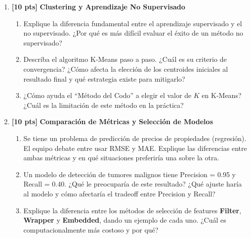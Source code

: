 \documentclass[11pt,a4paper]{article}
\newcommand{\puntaje}[1]{\textbf{[#1 pts]}}
\begin{document}
\begin{enumerate}[label=\textbf{\arabic*.}, leftmargin=*, itemsep=10pt]

\item \puntaje{10} \textbf{Clustering y Aprendizaje No Supervisado}

\begin{enumerate}[label=\textbf{\alph*)}]
  \item Explique la diferencia fundamental entre el aprendizaje supervisado y el no supervisado. ¿Por qu\'e es m\'as dif\'icil evaluar el \'exito de un m\'etodo no supervisado?
  \vspace{3.5cm}
  \item Describa el algoritmo K-Means paso a paso. ¿Cu\'al es su criterio de convergencia? ¿C\'omo afecta la elecci\'on de los centroides iniciales al resultado final y qu\'e estrategia existe para mitigarlo?
  \vspace{4cm}
  \item ¿C\'omo ayuda el ``M\'etodo del Codo'' a elegir el valor de $K$ en K-Means? ¿Cu\'al es la limitaci\'on de este m\'etodo en la pr\'actica?
  \vspace{3cm}
\end{enumerate}

\item \puntaje{10} \textbf{Comparaci\'on de M\'etricas y Selecci\'on de Modelos}

\begin{enumerate}[label=\textbf{\alph*)}]
  \item Se tiene un problema de predicci\'on de precios de propiedades (regresi\'on). El equipo debate entre usar RMSE y MAE. Explique las diferencias entre ambas m\'etricas y en qu\'e situaciones preferir\'ia una sobre la otra.
  \vspace{3.5cm}
  \item Un modelo de detecci\'on de tumores malignos tiene Precision = 0.95 y Recall = 0.40. ¿Qu\'e le preocupar\'ia de este resultado? ¿Qu\'e ajuste har\'ia al modelo y c\'omo afectar\'ia el tradeoff entre Precision y Recall?
  \vspace{3.5cm}
  \item Explique la diferencia entre los m\'etodos de selecci\'on de features \textbf{Filter}, \textbf{Wrapper} y \textbf{Embedded}, dando un ejemplo de cada uno. ¿Cu\'al es computacionalmente m\'as costoso y por qu\'e?
  \vspace{3.5cm}
\end{enumerate}


\end{enumerate}
\end{document}
